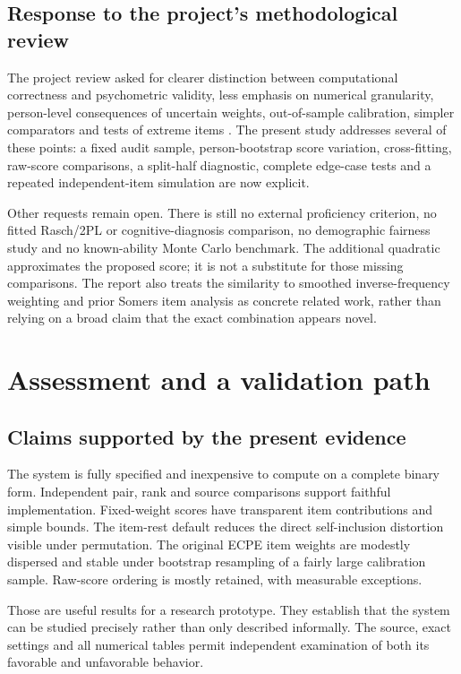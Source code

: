 \documentclass[11pt,a4paper,oneside,headings=normal,parskip=half]{scrreprt}
\begin{document}
\section{Response to the project's methodological review}
The project review asked for clearer distinction between computational correctness and psychometric validity, less emphasis on numerical granularity, person-level consequences of uncertain weights, out-of-sample calibration, simpler comparators and tests of extreme items \citep{projectreview}. The present study addresses several of these points: a fixed audit sample, person-bootstrap score variation, cross-fitting, raw-score comparisons, a split-half diagnostic, complete edge-case tests and a repeated independent-item simulation are now explicit.

Other requests remain open. There is still no external proficiency criterion, no fitted Rasch/2PL or cognitive-diagnosis comparison, no demographic fairness study and no known-ability Monte Carlo benchmark. The additional quadratic approximates the proposed score; it is not a substitute for those missing comparisons. The report also treats the similarity to smoothed inverse-frequency weighting and prior Somers item analysis as concrete related work, rather than relying on a broad claim that the exact combination appears novel.

\chapter{Assessment and a validation path}
\section{Claims supported by the present evidence}
The system is fully specified and inexpensive to compute on a complete binary form. Independent pair, rank and source comparisons support faithful implementation. Fixed-weight scores have transparent item contributions and simple bounds. The item-rest default reduces the direct self-inclusion distortion visible under permutation. The original ECPE item weights are modestly dispersed and stable under bootstrap resampling of a fairly large calibration sample. Raw-score ordering is mostly retained, with measurable exceptions.

Those are useful results for a research prototype. They establish that the system can be studied precisely rather than only described informally. The source, exact settings and all numerical tables permit independent examination of both its favorable and unfavorable behavior.
\end{document}
